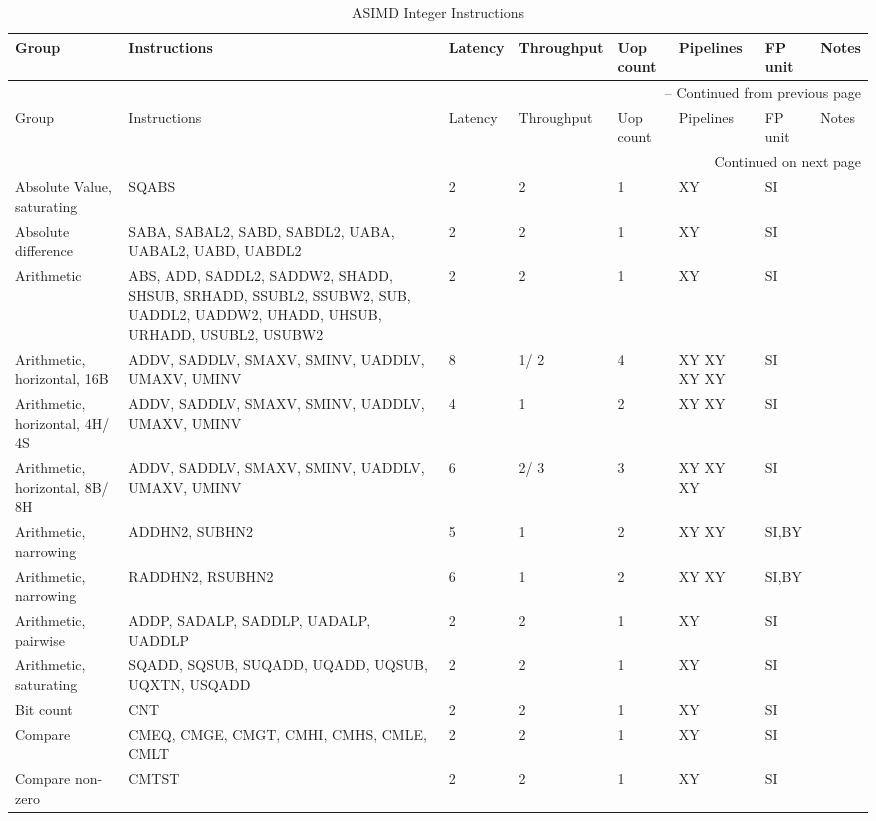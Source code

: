 \begin{longtable}{|p{1in}|p{1in}|l|l|l|p{1in}|l|p{1in}|}
\caption{ASIMD Integer Instructions} \\
\hline
Group & Instructions & Latency & Throughput & Uop count & Pipelines & FP unit & Notes\\
\hline
\endfirsthead
\hline
\multicolumn{8}{|r|}{{\tablename\ \thetable{} -- Continued from previous page}} \\
\hline
Group & Instructions & Latency & Throughput & Uop count & Pipelines & FP unit & Notes\\
\hline
\endhead
\hline
\multicolumn{8}{|r|}{{Continued on next page}} \\
\hline
\endfoot
\hline
\endlastfoot
Absolute Value, saturating & SQABS & 2 & 2 & 1 & XY & SI & \\
\hline
Absolute difference & SABA, SABAL{{2}}, SABD, SABDL{{2}}, UABA, UABAL{{2}}, UABD, UABDL{{2}} & 2 & 2 & 1 & XY & SI & \\
\hline
Arithmetic & ABS, ADD, SADDL{{2}}, SADDW{{2}}, SHADD, SHSUB, SRHADD, SSUBL{{2}}, SSUBW{{2}}, SUB, UADDL{{2}}, UADDW{{2}}, UHADD, UHSUB, URHADD, USUBL{{2}}, USUBW{{2}} & 2 & 2 & 1 & XY & SI & \\
\hline
Arithmetic, horizontal, 16B & ADDV, SADDLV, SMAXV, SMINV, UADDLV, UMAXV, UMINV & 8 & 1/ 2 & 4 & XY XY XY XY & SI & \\
\hline
Arithmetic, horizontal, 4H/ 4S & ADDV, SADDLV, SMAXV, SMINV, UADDLV, UMAXV, UMINV & 4 & 1 & 2 & XY XY & SI & \\
\hline
Arithmetic, horizontal, 8B/ 8H & ADDV, SADDLV, SMAXV, SMINV, UADDLV, UMAXV, UMINV & 6 & 2/ 3 & 3 & XY XY XY & SI & \\
\hline
Arithmetic, narrowing & ADDHN{{2}}, SUBHN{{2}} & 5 & 1 & 2 & XY XY & SI,BY & \\
\hline
Arithmetic, narrowing & RADDHN{{2}}, RSUBHN{{2}} & 6 & 1 & 2 & XY XY & SI,BY & \\
\hline
Arithmetic, pairwise & ADDP, SADALP, SADDLP, UADALP, UADDLP & 2 & 2 & 1 & XY & SI & \\
\hline
Arithmetic, saturating & SQADD, SQSUB, SUQADD, UQADD, UQSUB, UQXTN, USQADD & 2 & 2 & 1 & XY & SI & \\
\hline
Bit count & CNT & 2 & 2 & 1 & XY & SI & \\
\hline
Compare & CMEQ, CMGE, CMGT, CMHI, CMHS, CMLE, CMLT & 2 & 2 & 1 & XY & SI & \\
\hline
Compare non-zero & CMTST & 2 & 2 & 1 & XY & SI & \\
\hline

\end{longtable}
